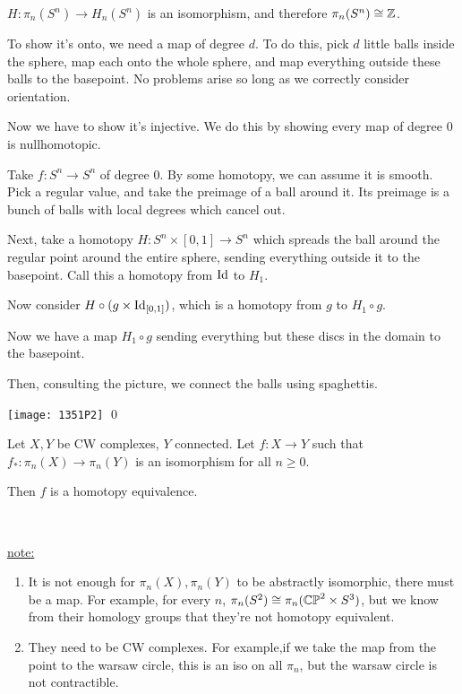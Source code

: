 \documentclass[x11names,reqno,14pt]{extarticle}
\begin{document}
\thm

$H:\pi_n(S^n) \to H_n(S^n)$ is an isomorphism, and therefore $\pi_n(S^n) \cong \mathbb{Z}$. 

\proof

To show it's onto, we need a map of degree $d$. To do this, pick $d$ little balls inside the sphere, map each onto the whole sphere, and map everything outside these balls to the basepoint. No problems arise so long as we correctly consider orientation. 

Now we have to show it's injective. We do this by showing every map of degree 0 is nullhomotopic. 

Take $f:S^n\to S^n$ of degree 0. By some homotopy, we can assume it is smooth. Pick a regular value, and take the preimage of a ball around it. Its preimage is a bunch of balls with local degrees which cancel out. 

Next, take a homotopy $H:S^n\times[0,1]\to S^n$ which spreads the ball around the regular point around the entire sphere, sending everything outside it to the basepoint. Call this a homotopy from $\operatorname{\mathrm{Id}}$ to $H_1$. 

Now consider $H \circ (g\times \operatorname{\mathrm{Id}}_{[0,1]})$, which is a homotopy from $g$ to $H_1\circ g$. 

Now we have a map $H_1\circ g$ sending everything but these discs in the domain to the basepoint. 

Then, consulting the picture, we connect the balls using spaghettis. 

\texttt{[image: 1351P2]}
\qed


Let $X, Y$ be CW complexes, $Y$ connected. Let $f:X\to Y$ such that $f_*:\pi_n(X) \to \pi_n(Y)$ is an isomorphism for all $n \geq0$. 

Then $f$ is a homotopy equivalence. 

\proof
\,

\underline{note:}
\begin{enumerate}[label=(\roman*)]

\item It is not enough for $\pi_n(X), \pi_n(Y)$ to be abstractly isomorphic, there must be a map. For example, for every $n$, $\pi_n(S^2) \cong \pi_n({\mathbb{CP}}^2\times S^3)$, but we know from their homology groups that they're not homotopy equivalent. 

\item They need to be CW complexes. For example,if we take the map from the point to the warsaw circle, this is an iso on all $\pi_n$, but the warsaw circle is not contractible. 

\end{enumerate}
\end{document}
